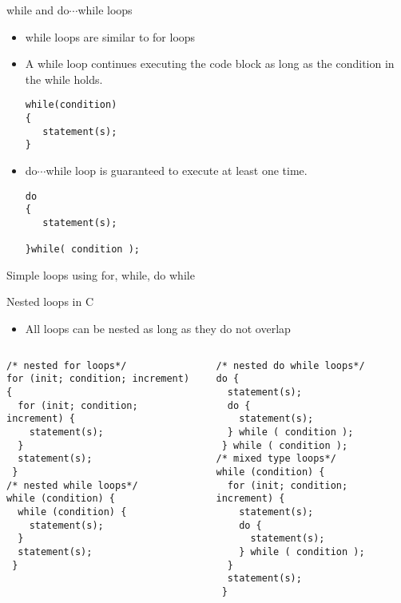 \documentclass[10pt,t]{beamer}
\begin{document}
\begin{frame}[fragile]{while and do$\cdots$while loops}
  \begin{itemize}
    \item while loops are similar to for loops
    \item A while loop continues executing the code block as long as the condition in the while holds.
      \begin{block}{}
        \begin{lstlisting}
while(condition)
{
   statement(s);
}
        \end{lstlisting}
      \end{block}
    \item do$\cdots$while loop is guaranteed to execute at least one time.
      \begin{block}{}
        \begin{lstlisting}
do
{
   statement(s);

}while( condition );
        \end{lstlisting}
      \end{block}
  \end{itemize}
\end{frame}

\begin{frame}[fragile]{Simple loops using for, while, do while}
  
\end{frame}

\begin{frame}[fragile]{Nested loops in C}
  \begin{itemize}
    \item All loops can be nested as long as they do not overlap
  \end{itemize}
  \begin{columns}
    \begin{block}{}
      \begin{lstlisting}[basicstyle=\scriptsize\ttfamily]
/* nested for loops*/
for (init; condition; increment) {
  for (init; condition; increment) {
    statement(s);
  }
  statement(s);
 }
/* nested while loops*/
while (condition) {
  while (condition) {
    statement(s);
  }
  statement(s);
 }
      \end{lstlisting}
    \end{block}
    \begin{block}{}
      \begin{lstlisting}[basicstyle=\scriptsize\ttfamily]
/* nested do while loops*/
do {
  statement(s);
  do {
    statement(s);
  } while ( condition );
 } while ( condition );
/* mixed type loops*/
while (condition) {
  for (init; condition; increment) {
    statement(s);
    do {
      statement(s);
    } while ( condition );
  }
  statement(s);
 }
      \end{lstlisting}
    \end{block}
  \end{columns}
\end{frame}
\end{document}
